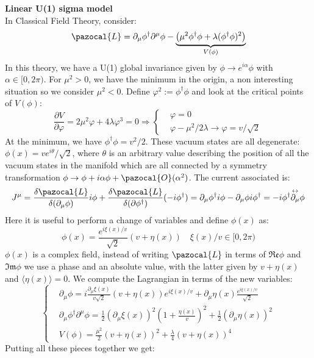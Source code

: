 \documentclass[../main.tex]{subfiles}
\begin{document}
\begin{example}
\textbf{Linear U(1) sigma model}\\
In Classical Field Theory, consider:
\[
\pazocal{L}=\partial_\mu\phi^\dagger\partial^\mu\phi-\underbrace{\left(\mu^2\phi^\dagger\phi+\lambda(\phi^\dagger\phi)^2\right)}_{V(\phi)}
\]
In this theory, we have a U(1) global invariance given by $\phi\to e^{i\alpha}\phi$ with $\alpha\in[0,2\pi)$. For $\mu^2>0$, we have the minimum in the origin, a non interesting situation so we consider $\mu^2<0$. Define $\varphi^2:=\phi^\dagger\phi$ and look at the critical points of $V(\phi)$:
\[
\frac{\partial V}{\partial\varphi}=2\mu^2\varphi+4\lambda\varphi^3=0\Rightarrow
\left\{
\begin{aligned}
&\varphi=0\\
&\varphi-\mu^2/2\lambda\to\varphi=v/\sqrt{2}
\end{aligned}
\right.
\]
At the minimum, we have $\phi^\dagger\phi=v^2/2$. These vacuum states are all degenerate: $\phi(x)=ve^{i\theta}/\sqrt{2}$, where $\theta$ is an arbitrary value describing the position of all the vacuum states in the manifold which are all connected by a symmetry transformation $\phi\to\phi+i\alpha\phi+\pazocal{O}(\alpha^2)$. The current associated is:
\[
J^\mu=\frac{\delta\pazocal{L}}{\delta(\partial_\mu\phi)}i\phi+\frac{\delta\pazocal{L}}{\delta(\partial\phi^\dagger)}(-i\phi^\dagger)=\partial_\mu\phi^\dagger i\phi-\partial_\mu\phi i\phi^\dagger=-i\phi^\dagger\overset{\leftrightarrow}{\partial_\mu}\phi
\]
Here it is useful to perform a change of variables and define $\phi(x)$ as:
\[
\phi(x)=\frac{e^{i\xi(x)/v}}{\sqrt{2}}(v+\eta(x)) \quad \xi(x)/v\in[0,2\pi)
\]
$\phi(x)$ is a complex field, instead of writing $\pazocal{L}$ in terms of $\mathfrak{Re}\phi$ and $\mathfrak{Im}\phi$ we use a phase and an absolute value, with the latter given by $v+\eta(x)$ and $\langle\eta(x)\rangle=0$. We compute the Lagrangian in terms of the new variables:
\[
\left\{
\begin{aligned}
&\partial_\mu\phi=i\frac{\partial_\mu\xi(x)}{v\sqrt{2}}(v+\eta(x))e^{i\xi(x)/v}+\partial_\mu\eta(x)\frac{e^{i\xi(x)/v}}{\sqrt{2}}\\
&\partial_\mu\phi^\dagger\partial^\mu\phi=\frac{1}{2}(\partial_\mu\xi(x))^2\left(1+\frac{\eta(x)}{v}\right)^2+\frac{1}{2}(\partial_\mu\eta(x))^2\\
&V(\phi)=\frac{\mu^2}{2}(v+\eta(x))^2+\frac{\lambda}{4}(v+\eta(x))^4
\end{aligned}
\right.
\]
Putting all these pieces together we get:
\begin{align*}

\end{align*}
\end{example}
\end{document}
